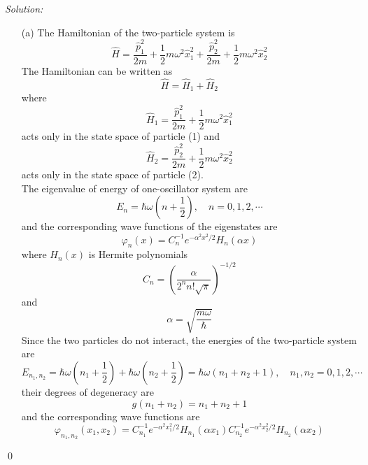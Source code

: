 \documentclass[12pt,a4paper]{article}
\newenvironment{sol}
    {\emph{Solution:}
    }
    {
    \qed
    }
\begin{document}
\begin{sol}
\begin{itemize}
\item[(a)] The Hamiltonian of the two-particle system is
\begin{equation}
\hat{H}=\frac{\hat{p}_1^2}{2m}+\frac{1}{2}m\omega^2\hat{x}_1^2+\frac{\hat{p}_2^2}{2m}+\frac{1}{2}m\omega^2\hat{x}_2^2
\end{equation}
The Hamiltonian can be written as
\begin{equation}
\hat{H}=\hat{H}_1+\hat{H}_2
\end{equation}
where
\begin{equation}
\hat{H}_1=\frac{\hat{p}_1^2}{2m}+\frac{1}{2}m\omega^2\hat{x}_1^2
\end{equation}
acts only in the state space of particle (1) and
\begin{equation}
\hat{H}_2=\frac{\hat{p}_2^2}{2m}+\frac{1}{2}m\omega^2\hat{x}_2^2
\end{equation}
acts only in the state space of particle (2).\\
The eigenvalue of energy of one-oscillator system are
\begin{equation}
E_n=\hbar\omega(n+\frac{1}{2}),\quad n=0,1,2,\cdots
\end{equation}
and the corresponding wave functions of the eigenstates are
\begin{equation}
\varphi_n(x)=C_n^{-1}e^{-\alpha^2x^2/2}H_n(\alpha x)
\end{equation}
where $H_n(x)$ is Hermite polynomials
\begin{equation}
C_n=\left(\frac{\alpha}{2^nn!\sqrt{\pi}}\right)^{-1/2}
\end{equation}
and
\begin{equation}
\alpha=\sqrt{\frac{m\omega}{\hbar}}
\end{equation}
Since the two particles do not interact, the energies of the two-particle system are
\begin{equation}
E_{n_1,n_2}=\hbar\omega(n_1+\frac{1}{2})+\hbar\omega(n_2+\frac{1}{2})=\hbar\omega(n_1+n_2+1),\quad n_1,n_2=0,1,2,\cdots
\end{equation}
their degrees of degeneracy are
\begin{equation}
g(n_1+n_2)=n_1+n_2+1
\end{equation}
and the corresponding wave functions are
\begin{equation}
\varphi_{n_1,n_2}(x_1,x_2)=C_{n_1}^{-1}e^{-\alpha^2x_1^2/2}H_{n_1}(\alpha x_1)C_{n_2}^{-1}e^{-\alpha^2x_2^2/2}H_{n_2}(\alpha x_2)

\end{equation}
\end{itemize}
\end{sol}
\end{document}
